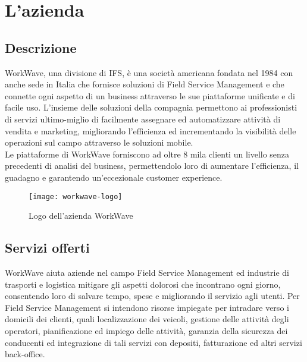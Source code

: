 
\chapter{L'azienda}
\label{cap:azienda}

\section{Descrizione}

WorkWave, una divisione di IFS, è una società americana fondata nel 1984 con anche sede in Italia che fornisce soluzioni di Field Service Management e che connette ogni aspetto di un business attraverso le sue piattaforme unificate e di facile uso. L'insieme delle soluzioni della compagnia permettono ai professionisti di servizi ultimo-miglio di facilmente assegnare ed automatizzare attività di vendita e marketing, migliorando l'efficienza ed incrementando la visibilità delle operazioni sul campo attraverso le soluzioni mobile. \\

Le piattaforme di WorkWave forniscono ad oltre 8 mila clienti un livello senza precedenti di analisi del business, permettendolo loro di aumentare l'efficienza, il guadagno e garantendo un'eccezionale customer experience.

\begin{figure}[H] 
  \centering 
  \texttt{[image: workwave-logo]} 
  \caption{Logo dell'azienda WorkWave}
\end{figure}

\section{Servizi offerti}

WorkWave aiuta aziende nel campo Field Service Management ed industrie di trasporti e logistica mitigare gli aspetti dolorosi che incontrano ogni giorno, consentendo loro di salvare tempo, spese e migliorando il servizio agli utenti. Per Field Service Management si intendono risorse impiegate per intradare verso i domicili dei clienti, quali localizzazione dei veicoli, gestione delle attività degli operatori, pianificazione ed impiego delle attività, garanzia della sicurezza dei conducenti ed integrazione di tali servizi con depositi, fatturazione ed altri servizi back-office. \\

